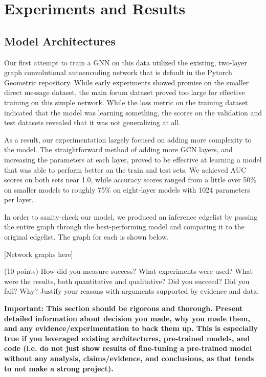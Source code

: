 \documentclass[10pt,twocolumn,letterpaper]{article}
\begin{document}
\section{Experiments and Results}
\subsection{Model Architectures}

Our first attempt to train a GNN on this data utilized the existing, two-layer graph convolutional autoencoding network that is default in the Pytorch Geometric repository. While early experiments showed promise on the smaller direct message dataset, the main forum dataset proved too large for effective training on this simple network. While the loss metric on the training dataset indicated that the model was learning something, the scores on the validation and test datasets revealed that it was not generalizing at all. 

As a result, our experimentation largely focused on adding more complexity to the model. The straightforward method of adding more GCN layers, and increasing the parameters at each layer, proved to be effective at learning a model that was able to perform better on the train and test sets. We achieved AUC scores on both sets near 1.0, while accuracy scores ranged from a little over 50\% on smaller models to roughly 75\% on eight-layer models with 1024 parameters per layer. 

In order to sanity-check our model, we produced an inference edgelist by passing the entire graph through the best-performing model and comparing it to the original edgelist. The graph for each is shown below. 

[Network graphs here]

(10 points) How did you measure success? What experiments were used? What were the results, both quantitative and qualitative? Did you succeed? Did you fail? Why? Justify your reasons with arguments supported by evidence and data.

\textbf{Important: This section should be rigorous and thorough. Present detailed information about decision you made, why you made them, and any evidence/experimentation to back them up. This is especially true if you leveraged existing architectures, pre-trained models, and code (i.e. do not just show results of fine-tuning a pre-trained model without any analysis, claims/evidence, and conclusions, as that tends to not make a strong project). }

\end{document}
